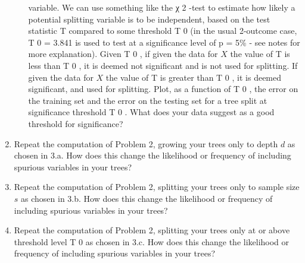 \documentclass[letter, 12pt]{article}
\begin{document}
\begin{enumerate}
\begin{enumerate}
{        		variable. We can use something like the χ 2 -test to estimate how likely a potential splitting variable is
        		to be independent, based on the test statistic T compared to some threshold T 0 (in the usual 2-outcome
        		case, T 0 = 3.841 is used to test at a significance level of p = 5\% - see notes for more explanation). Given
        		T 0 , if given the data for $ X $ the value of T is less than T 0 , it is deemed not significant and is not used for
        		splitting. If given the data for $ X $ the value of T is greater than T 0 , it is deemed significant, and used for
        		splitting. Plot, as a function of T 0 , the error on the training set and the error on the testing set for a tree
        		split at significance threshold T 0 . What does your data suggest as a good threshold for significance?}
        \end{enumerate}
        \item{Repeat the computation of Problem 2, growing your trees only to depth $ d $ as chosen in 3.a. How does this
        	change the likelihood or frequency of including spurious variables in your trees?}
        \item{Repeat the computation of Problem 2, splitting your trees only to sample size $ s $ as chosen in 3.b. How does
        	this change the likelihood or frequency of including spurious variables in your trees?}
        \item{Repeat the computation of Problem 2, splitting your trees only at or above threshold level T 0 as chosen in 3.c.
        	How does this change the likelihood or frequency of including spurious variables in your trees?}
    \end{enumerate}
\end{document}
